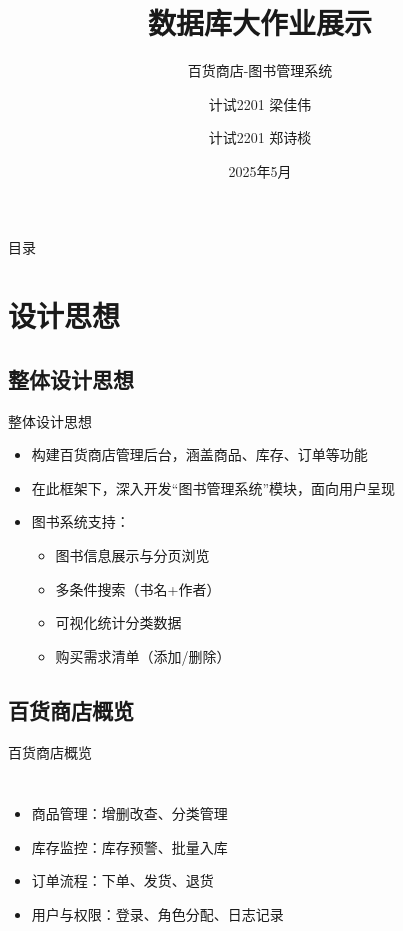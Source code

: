 \documentclass{ctexbeamer}
\title{数据库大作业展示}
\subtitle{百货商店-图书管理系统}
\author{计试2201 梁佳伟 \and 计试2201 郑诗棪}
\institute[西安交大]{西安交通大学}
\date{2025年5月}
\begin{document}
\begin{frame}
  \titlepage
\end{frame}

\begin{frame}{目录}
  \tableofcontents
\end{frame}

\section{设计思想}

\subsection{整体设计思想}
\begin{frame}{整体设计思想}
  \begin{itemize}
    \item 构建百货商店管理后台，涵盖商品、库存、订单等功能
    \item 在此框架下，深入开发“图书管理系统”模块，面向用户呈现
    \item 图书系统支持：\pause
      \begin{itemize}
        \item 图书信息展示与分页浏览
        \item 多条件搜索（书名+作者）
        \item 可视化统计分类数据
        \item 购买需求清单（添加/删除）
      \end{itemize}
  \end{itemize}
\end{frame}

\subsection{百货商店概览}
\begin{frame}{百货商店概览}
  \begin{columns}
      \begin{itemize}
        \item 商品管理：增删改查、分类管理
        \item 库存监控：库存预警、批量入库
        \item 订单流程：下单、发货、退货
        \item 用户与权限：登录、角色分配、日志记录
      \end{itemize}
  \end{columns}
\end{frame}
\end{document}
